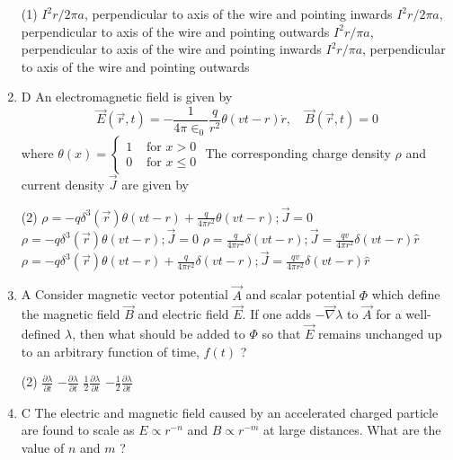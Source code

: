 \begin{enumerate}
	\begin{tasks}(1)
		\task[\textbf{A.}] $I^{2} r / 2 \pi a$, perpendicular to axis of the wire and pointing inwards
		\task[\textbf{B.}]$I^{2} r / 2 \pi a$, perpendicular to axis of the wire and pointing outwards
		\task[\textbf{C.}]$I^{2} r / \pi a$, perpendicular to axis of the wire and pointing inwards
		\task[\textbf{D.}]$I^{2} r / \pi a$, perpendicular to axis of the wire and pointing outwards
	\end{tasks}
\item D An electromagnetic field is given by
$$
\vec{E}(\vec{r}, t)=-\frac{1}{4 \pi \in_{0}} \frac{q}{r^{2}} \theta(v t-r) \dot{r}, \quad \vec{B}(\vec{r}, t)=0
$$
where $\theta(x)= \begin{cases}1 & \text { for } x>0 \\ 0 & \text { for } x \leq 0\end{cases}$
The corresponding charge density $\rho$ and current density $\vec{J}$ are given by
{}
 \begin{tasks}(2)
	\task[\textbf{a.}]$\rho=-q \delta^{3}(\vec{r}) \theta(v t-r)+\frac{q}{4 \pi r^{2}} \theta(v t-r) ; \vec{J}=0$
	\task[\textbf{b.}]$\rho=-q \delta^{3}(\vec{r}) \theta(v t-r) ; \vec{J}=0$
	\task[\textbf{c.}]$\rho=\frac{q}{4 \pi r^{2}} \delta(v t-r) ; \vec{J}=\frac{q v}{4 \pi r^{2}} \delta(v t-r) \hat{r}$
	\task[\textbf{d.}] $\rho=-q \delta^{3}(\vec{r}) \theta(v t-r)+\frac{q}{4 \pi r^{2}} \delta(v t-r) ; \vec{J}=\frac{q v}{4 \pi r^{2}} \delta(v t-r) \hat{r}$
\end{tasks}
\item A Consider magnetic vector potential $\vec{A}$ and scalar potential $\Phi$ which define the magnetic field $\vec{B}$ and electric field $\vec{E}$. If one adds $-\vec{\nabla} \lambda$ to $\vec{A}$ for a well-defined $\lambda$, then what should be added to $\Phi$ so that $\vec{E}$ remains unchanged up to an arbitrary function of time, $f(t)$ ?
{}
 \begin{tasks}(2)
	\task[\textbf{a.}]$\frac{\partial \lambda}{\partial t}$
	\task[\textbf{b.}]$-\frac{\partial \lambda}{\partial t}$
	\task[\textbf{c.}] $\frac{1}{2} \frac{\partial \lambda}{\partial t}$
	\task[\textbf{d.}]  $-\frac{1}{2} \frac{\partial \lambda}{\partial t}$
\end{tasks}
\item C The electric and magnetic field caused by an accelerated charged particle are found to scale as $E \propto r^{-n}$ and $B \propto r^{-m}$ at large distances. What are the value of $n$ and $m$ ?

\end{enumerate}
